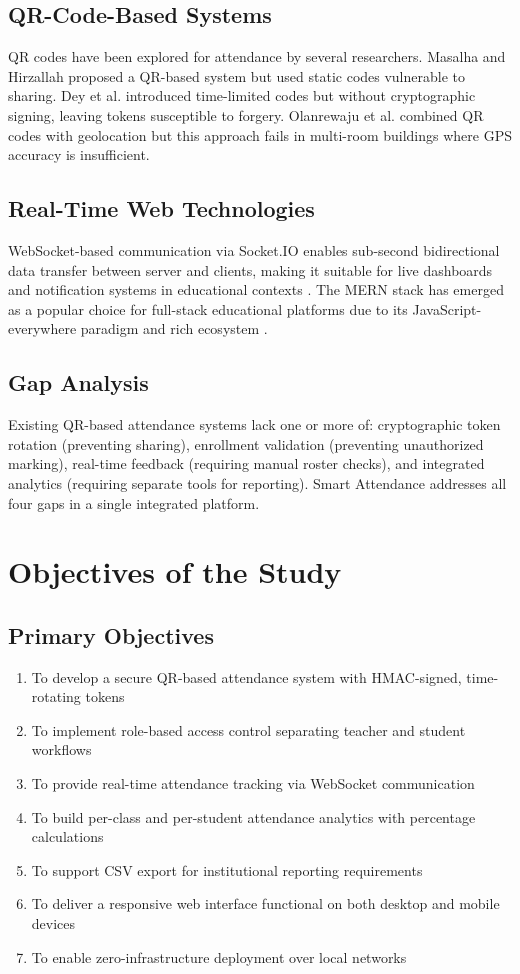 \documentclass[conference]{IEEEtran}
\begin{document}
\subsection{QR-Code-Based Systems}
QR codes have been explored for attendance by several researchers. Masalha and Hirzallah \cite{b3} proposed a QR-based system but used static codes vulnerable to sharing. Dey et al. \cite{b6} introduced time-limited codes but without cryptographic signing, leaving tokens susceptible to forgery. Olanrewaju et al. \cite{b7} combined QR codes with geolocation but this approach fails in multi-room buildings where GPS accuracy is insufficient.

\subsection{Real-Time Web Technologies}
WebSocket-based communication via Socket.IO enables sub-second bidirectional data transfer between server and clients, making it suitable for live dashboards and notification systems in educational contexts \cite{b8}. The MERN stack has emerged as a popular choice for full-stack educational platforms due to its JavaScript-everywhere paradigm and rich ecosystem \cite{b9}.

\subsection{Gap Analysis}
Existing QR-based attendance systems lack one or more of: cryptographic token rotation (preventing sharing), enrollment validation (preventing unauthorized marking), real-time feedback (requiring manual roster checks), and integrated analytics (requiring separate tools for reporting). Smart Attendance addresses all four gaps in a single integrated platform.

\section{Objectives of the Study}

\subsection{Primary Objectives}
\begin{enumerate}
\item To develop a secure QR-based attendance system with HMAC-signed, time-rotating tokens
\item To implement role-based access control separating teacher and student workflows
\item To provide real-time attendance tracking via WebSocket communication
\item To build per-class and per-student attendance analytics with percentage calculations
\item To support CSV export for institutional reporting requirements
\item To deliver a responsive web interface functional on both desktop and mobile devices
\item To enable zero-infrastructure deployment over local networks
\end{enumerate}
\end{document}
